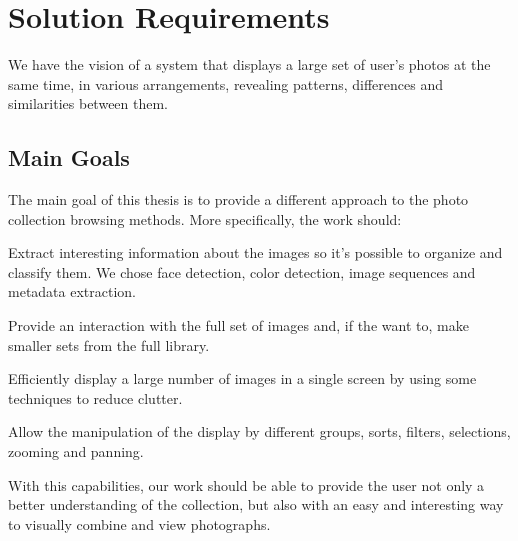 \section{Solution Requirements} %
\label{chapter:solution_requirements}


We have the vision of a system that displays a large set of user’s photos at the same time, in various arrangements, revealing patterns, differences and similarities between them.


\subsection{Main Goals} %
\label{reqs:main_goal}

The main goal of this thesis is to provide a different approach to the photo collection browsing methods. More specifically, the work should:


Extract interesting information about the images so it's possible to organize and classify them. We chose face detection, color detection, image sequences and metadata extraction.


Provide an interaction with the full set of images and, if the want to, make smaller sets from the full library.


Efficiently display a large number of images in a single screen by using some techniques to reduce clutter.

Allow the manipulation of the display by different groups, sorts, filters, selections, zooming and panning.
	
With this capabilities, our work should be able to provide the user not only a better understanding of the collection, but also with an easy and interesting way to visually combine and view photographs.





